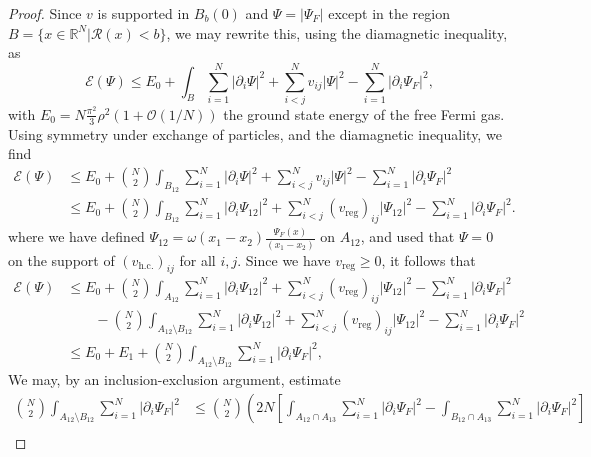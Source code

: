 \documentclass[a4paper,11pt]{article}
\newcommand{\abs}[1]{\left\lvert #1 \right\rvert}
\newcommand{\R}{\mathbb{R}}
\newcommand{\rr}{\mathcal{R}}
\numberwithin{equation}{section}
\begin{document}
	\begin{proof}
		Since $ v $ is supported in $ B_b(0) $ and $ \Psi=\abs{\Psi_F} $ except in the region $ B=\{x\in\R^N \vert \rr(x)<b \} $, we may rewrite this, using the diamagnetic inequality, as \begin{equation}
		\mathcal{E}(\Psi)\leq E_0+\int_B \sum_{i=1}^{N}\abs{\partial_i\Psi}^2+\sum_{i<j}^{N}v_{ij}\abs{\Psi}^2-\sum_{i=1}^{N}\abs{\partial_i\Psi_F}^2,
		\end{equation}
		with $ E_0=N\frac{\pi^2}{3}\rho^2(1+\mathcal{O}(1/N)) $ the ground state energy of the free Fermi gas. Using symmetry under exchange of particles, and the diamagnetic inequality, we find \begin{equation}
		\begin{aligned}
		\mathcal{E}(\Psi)&\leq E_0+\binom{N}{2}\int_{B_{12}} \sum_{i=1}^{N}\abs{\partial_i\Psi}^2+\sum_{i<j}^{N}v_{ij}\abs{\Psi}^2-\sum_{i=1}^{N}\abs{\partial_i\Psi_F}^2\\&
		\leq E_0+\binom{N}{2}\int_{B_{12}} \sum_{i=1}^{N}\abs{\partial_i\Psi_{12}}^2+\sum_{i<j}^{N}(v_{\text{reg}})_{ij}\abs{\Psi_{12}}^2-\sum_{i=1}^{N}\abs{\partial_i\Psi_F}^2.
		\end{aligned}
		\end{equation}
		where we have defined $
		\Psi_{12}=
		\omega(x_1-x_2)\frac{\Psi_F(x)}{(x_1-x_2)} $ on $ A_{12} $,
		and used that $ \Psi=0 $ on the support of $ (v_{\text{h.c.}})_{ij} $ for all $ i,j $. Since we have $ v_{\text{reg}}\geq0 $, it follows that
		\begin{equation}
		\begin{aligned}
		\mathcal{E}(\Psi)&\leq E_0+\binom{N}{2}\int_{A_{12}} \sum_{i=1}^{N}\abs{\partial_i\Psi_{12}}^2+\sum_{i<j}^{N}(v_{\text{reg}})_{ij}\abs{\Psi_{12}}^2-\sum_{i=1}^{N}\abs{\partial_i\Psi_F}^2\\&\qquad
		-\binom{N}{2}\int_{A_{12}\setminus B_{12}} \sum_{i=1}^{N}\abs{\partial_i\Psi_{12}}^2+\sum_{i<j}^{N}(v_{\text{reg}})_{ij}\abs{\Psi_{12}}^2-\sum_{i=1}^{N}\abs{\partial_i\Psi_F}^2\\&
		\leq E_0+E_1+\binom{N}{2}\int_{A_{12}\setminus B_{12}}\sum_{i=1}^{N}\abs{\partial_i\Psi_F}^2,
		\end{aligned}
		\end{equation}	
		We may, by an inclusion-exclusion argument, estimate\begin{equation}
		\begin{aligned}
		\binom{N}{2}\int_{A_{12}\setminus B_{12}}\sum_{i=1}^{N}\abs{\partial_i\Psi_F}^2&\leq \binom{N}{2}\left(2N\left[\int_{A_{12}\cap A_{13}}\sum_{i=1}^{N}\abs{\partial_i\Psi_F}^2-\int_{B_{12}\cap A_{13}}\sum_{i=1}^{N}\abs{\partial_i\Psi_F}^2\right]\right.\\

\end{aligned}
\end{equation}
\end{proof}
\end{document}
